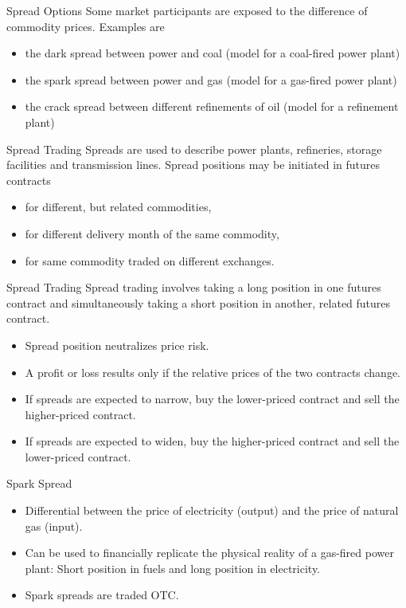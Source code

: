{Spread Options}
Some market participants are exposed to the difference of
commodity prices. Examples are
\begin{itemize}
  \item<1-> the dark spread between power and coal (model for a coal-fired power plant)
  \item<2-> the spark spread between power and gas (model for a gas-fired power plant)
  \item<3-> the crack spread between different refinements of oil (model for a refinement plant)
\end{itemize}



{Spread Trading}
Spreads are used to describe power plants, refineries, storage facilities and transmission lines. Spread positions may be initiated in futures contracts
\begin{itemize}
  \item<1-> for different, but related commodities,
  \item<2-> for different delivery month of the same commodity,
  \item<3-> for same commodity traded on different exchanges.
\end{itemize}



{Spread Trading}
Spread trading involves taking a long position in one futures contract and simultaneously taking a short position in another, related futures contract.
\begin{itemize}
  \item<1-> Spread position neutralizes price risk.
  \item<2-> A profit or loss results only if the relative prices of the two contracts change.
  \item<3-> If spreads are expected to narrow, buy the lower-priced contract and sell the higher-priced contract.
  \item<4-> If spreads are expected to widen, buy the higher-priced contract and sell the lower-priced contract.
\end{itemize}




{Spark Spread}
\begin{itemize}
  \item<1-> Differential between the price of electricity (output) and the price of natural gas (input).
  \item<2-> Can be used to financially replicate the physical reality of a gas-fired power plant: Short position in fuels and long position in electricity.
  \item<3-> Spark spreads are traded OTC.
\end{itemize}



